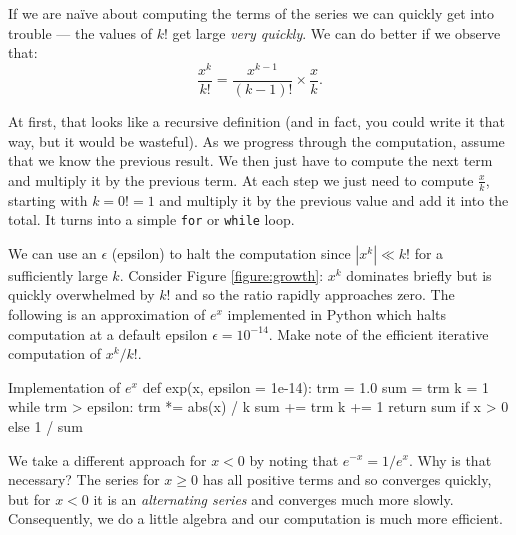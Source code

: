 If we are na\"ive about computing the terms of the series we can quickly
get into trouble --- the values of $k!$ get large \emph{very quickly}.
We can do better if we observe that:
$$
\frac{x^k}{k!} = \frac{x^{k-1}}{(k-1)!} \times \frac{x}{k} .
$$

At first, that looks like a recursive definition (and in fact, you could
write it that way, but it would be wasteful). As we progress through the
computation, assume that we know the previous result. We then just have
to compute the next term and multiply it by the previous term.  At each
step we just need to compute $\frac{x}{k}$, starting with $k = 0!=1$
and multiply it by the previous value and add it
into the total. It turns into a simple \texttt{for} or \texttt{while}
loop.

We can use an $\epsilon$ (epsilon) to halt the computation since $|x^k| \ll k!$
for a sufficiently large $k$. Consider Figure \ref{figure:growth}: $x^k$
dominates briefly but is quickly overwhelmed by $k!$ and so the ratio rapidly
approaches zero. The following is an approximation of $e^x$ implemented in
Python which halts computation at a default epsilon $\epsilon = 10^{-14}$.
Make note of the efficient iterative computation of $x^k/k!$.

\begin{pylisting}{Implementation of $e^x$}
def exp(x, epsilon = 1e-14):
    trm = 1.0
    sum = trm
    k = 1
    while trm > epsilon:
        trm *= abs(x) / k
        sum += trm
        k += 1
    return sum if x > 0 else 1 / sum
\end{pylisting}

We take a different approach for $x<0$ by noting that $e^{-x} = 1/e^x$. Why is
that necessary? The series for $x\ge 0$ has all positive terms and so converges
quickly, but for $x < 0$ it is an \emph{alternating series} and converges much
more slowly. Consequently, we do a little algebra and our computation is much
more efficient.
